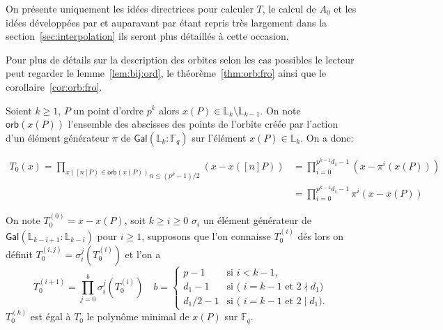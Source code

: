\documentclass[10pt,a4paper]{book}
\theoremstyle{plain}
\theoremstyle{definition}
\theoremstyle{definition}
\theoremstyle{definition}
\theoremstyle{definition}
\theoremstyle{definition}
\theoremstyle{remark}
\theoremstyle{remark}
\theoremstyle{definition}
\begin{document}

On présente uniquement les idées directrices pour calculer $T$, le calcul de 
$A_0$ et les idées développées par \cite{DeFeo11} et auparavant par 
\cite{EngeMorain03} étant repris très largement dans la 
section~\ref{sec:interpolation} ils seront plus détaillés à cette occasion.


Pour plus de détails sur la description des orbites selon les cas 
possibles le lecteur peut regarder le  lemme~\ref{lem:bij:ord}, le 
théorème~\ref{thm:orb:fro} ainsi que le corollaire~\ref{cor:orb:fro}.

Soient $k \geqslant 1$, $P$ un point d'ordre $p^k$ alors $x(P) \in \mathbb{L}_{k} \setminus \mathbb{L}_{k-1}$. On note $\mathsf{orb}(x(P))$ l'ensemble des abscisses des points de l'orbite créée par l'action d'un élément générateur $\pi$ de $\mathsf{Gal}(\mathbb{L}_k:\mathbb{F}_{q})$ sur l'élément $x(P) \in \mathbb{L}_k$. On a donc: 

\begin{equation*}
\begin{alignedat}{1}
T_{0}(x)= \overset{}{\underset{n \leqslant (p^k-1)/2}{\underset{x([n]P) \in \mathsf{orb}(x(P)) }{\prod }}}(x-x([n]P)) &=\prod_{i=0}^{p^{k-1}d_1-1}(x-\pi^i(x(P))) \\
&=\prod_{i=0}^{{p^{k-1}d_1-1}}\pi^i(x-x(P))
\end{alignedat}
\end{equation*}

On note $T_0^{(0)}=x-x(P)$, soit $k \geqslant i\geqslant 0$ $\sigma_i$ un élément générateur de $\mathsf{Gal}(\mathbb{L}_{k-i+1}:\mathbb{L}_{k-i})$ pour $i \geqslant 1$, supposons que l'on connaisse $T_0^{(i)}$ dés lors on définit $T_0^{(i,j)}=\sigma_i^j(T_0^{(i)})$ et l'on a 
\[
T_0^{(i+1)}=\prod_{j=0}^{b} \sigma_i^j(T_0^{(i)}) \quad  b = \begin{cases}
    p-1 &\text{si $i<k-1$,}\\
    d_1 -1  &\text{si ( $i=k-1$ et $2 \nmid d_1$)}\\
    d_1/2 - 1 &\text{si ( $i=k-1$ et $2 \mid d_1 $)}.
  \end{cases}
\]
 $T_0^{(k)}$ est égal à $T_0$ le polynôme minimal de $x(P)$ sur $\mathbb{F}_q$.
\end{document}
